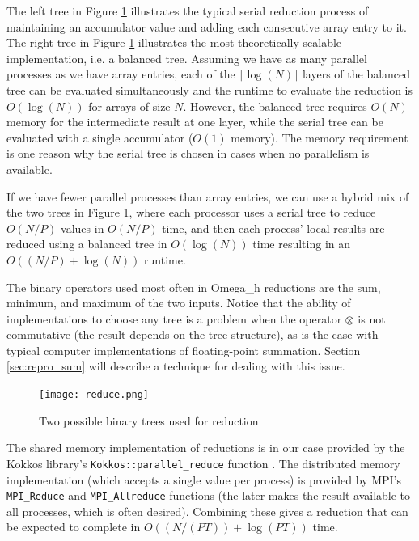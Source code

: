 The left tree in Figure \ref{fig:reduce} illustrates the typical
serial reduction process of maintaining an accumulator value and
adding each consecutive array entry to it.
The right tree in Figure \ref{fig:reduce} illustrates the most theoretically
scalable implementation, i.e. a balanced tree.
Assuming we have as many parallel processes as we have array entries,
each of the $\lceil\log(N)\rceil$ layers of the balanced tree
can be evaluated simultaneously and the
runtime to evaluate the reduction is $O(\log(N))$ for arrays of size $N$.
However, the balanced tree requires $O(N)$ memory for the intermediate
result at one layer, while the serial tree can be evaluated with
a single accumulator ($O(1)$ memory).
The memory requirement is one reason why the serial tree is chosen
in cases when no parallelism is available.

If we have fewer parallel processes than array entries, we can use a hybrid mix
of the two trees in Figure \ref{fig:reduce}, where each processor
uses a serial tree to reduce $O(N/P)$ values in $O(N/P)$ time, and
then each process' local results are reduced using a balanced tree
in $O(\log(N))$ time resulting in an $O((N/P)+\log(N))$ runtime.

The binary operators used most often in Omega\_h reductions
are the sum, minimum, and maximum of the two inputs.
Notice that the ability of implementations to choose any tree
is a problem when the operator $\otimes$ is not commutative
(the result depends on the tree structure),
as is the case with typical computer implementations of floating-point summation.
Section \ref{sec:repro_sum} will describe a technique for dealing
with this issue.

\begin{figure}
\begin{center}
\texttt{[image: reduce.png]}
\caption{Two possible binary trees used for reduction}
\label{fig:reduce}
\end{center}
\end{figure}

The shared memory implementation of reductions is in our case
provided by the Kokkos library's \texttt{Kokkos::parallel\_reduce}
function \cite{edwards2013kokkos}.
The distributed memory implementation (which accepts a single value
per process) is provided by MPI's \texttt{MPI\_Reduce} and \texttt{MPI\_Allreduce}
functions (the later makes the result available to all processes, which is
often desired).
Combining these gives a reduction that can be expected to
complete in $O((N/(PT))+\log(PT))$ time.


